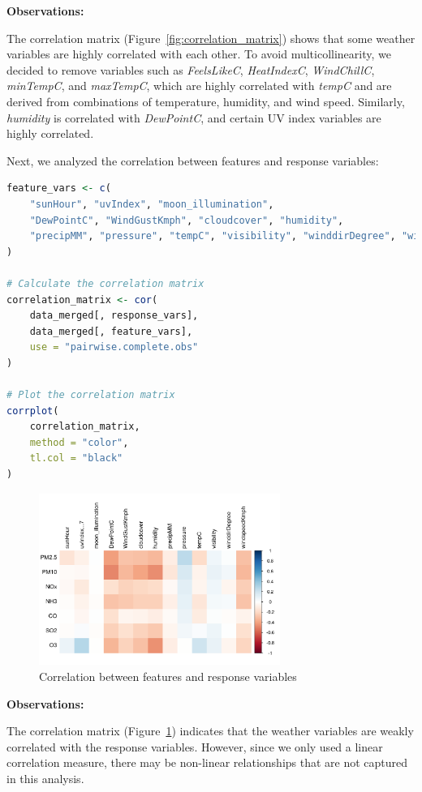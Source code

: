\documentclass[12pt]{article}
\begin{document}
\textbf{Observations:}

The correlation matrix (Figure~\ref{fig:correlation_matrix}) shows that some weather variables are highly correlated with each other. To avoid multicollinearity, we decided to remove variables such as \textit{FeelsLikeC}, \textit{HeatIndexC}, \textit{WindChillC}, \textit{minTempC}, and \textit{maxTempC}, which are highly correlated with \textit{tempC} and are derived from combinations of temperature, humidity, and wind speed. Similarly, \textit{humidity} is correlated with \textit{DewPointC}, and certain UV index variables are highly correlated.

Next, we analyzed the correlation between features and response variables:

\begin{lstlisting}[language=R]
feature_vars <- c(
    "sunHour", "uvIndex", "moon_illumination",
    "DewPointC", "WindGustKmph", "cloudcover", "humidity",
    "precipMM", "pressure", "tempC", "visibility", "winddirDegree", "windspeedKmph"
)

# Calculate the correlation matrix
correlation_matrix <- cor(
    data_merged[, response_vars],
    data_merged[, feature_vars],
    use = "pairwise.complete.obs"
)

# Plot the correlation matrix
corrplot(
    correlation_matrix,
    method = "color",
    tl.col = "black"
)
\end{lstlisting}

\begin{figure}[H]
    \centering
    \includegraphics[width=0.7\textwidth]{feature-response-correlation.png}
    \caption{Correlation between features and response variables}
    \label{fig:feature_response_correlation}
\end{figure}

\textbf{Observations:}

The correlation matrix (Figure~\ref{fig:feature_response_correlation}) indicates that the weather variables are weakly correlated with the response variables. However, since we only used a linear correlation measure, there may be non-linear relationships that are not captured in this analysis.

\newpage

\printbibliography
\end{document}
